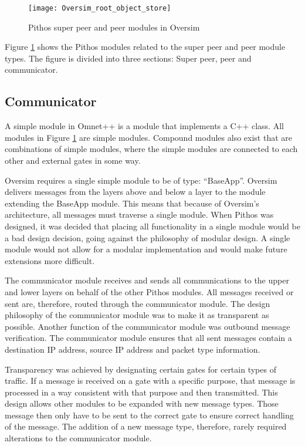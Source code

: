 \begin{figure}[htbp]
 \centering
 \texttt{[image: Oversim\_root\_object\_store]}
 \caption{Pithos super peer and peer modules in Oversim}
 \label{fig_oversim_root_object_store}
\end{figure}
%
Figure \ref{fig_oversim_root_object_store} shows the Pithos modules related to the super peer and peer module types. The figure is divided into three sections: Super peer, peer and communicator.

\subsection{Communicator}

A simple module in Omnet++ is a module that implements a C++ class. All modules in Figure \ref{fig_oversim_root_object_store} are simple modules. Compound modules also exist that are combinations of simple modules, where the simple modules are connected to each other and external gates in some way.

Oversim requires a single simple module to be of type: ``BaseApp''. Oversim delivers messages from the layers above and below a layer to the module extending the BaseApp module. This means that because of Oversim's architecture, all messages must traverse a single module. When Pithos was designed, it was decided that placing all functionality in a single module would be a bad design decision, going against the philosophy of modular design. A single module would not allow for a modular implementation and would make future extensions more difficult.

The communicator module receives and sends all communications to the upper and lower layers on behalf of the other Pithos modules. All messages received or sent are, therefore, routed through the communicator module. The design philosophy of the communicator module was to make it as transparent as possible. Another function of the communicator module was outbound message verification. The communicator module ensures that all sent messages contain a destination IP address, source IP address and packet type information.

Transparency was achieved by designating certain gates for certain types of traffic. If a message is received on a gate with a specific purpose, that message is processed in a way consistent with that purpose and then transmitted. This design allows other modules to be expanded with new message types. Those message then only have to be sent to the correct gate to ensure correct handling of the message. The addition of a new message type, therefore, rarely required alterations to the communicator module.

